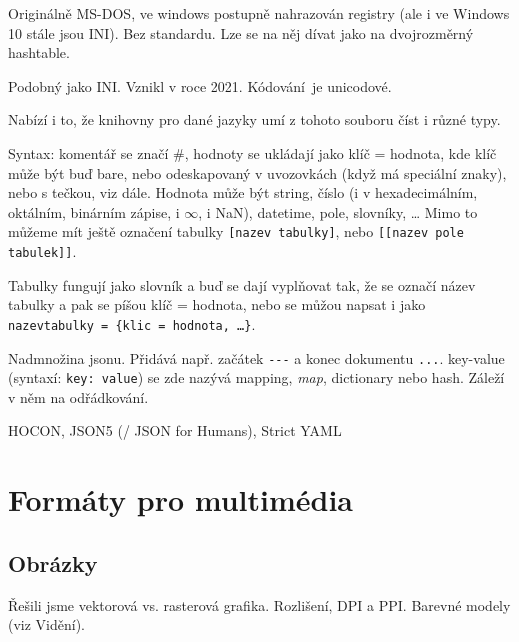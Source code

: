 \documentclass[12pt]{article}					%
\begin{document}
\begin{definice}
	Originálně MS-DOS, ve windows postupně nahrazován registry (ale i ve Windows 10 stále jsou INI). Bez standardu. Lze se na něj dívat jako na dvojrozměrný hashtable.
\end{definice}

\begin{definice}[TOML]
	Podobný jako INI. Vznikl v roce 2021. Kódování je unicodové. 

	Nabízí i to, že knihovny pro dané jazyky umí z tohoto souboru číst i různé typy.

	Syntax: komentář se značí \#, hodnoty se ukládají jako klíč = hodnota, kde klíč může být buď bare, nebo odeskapovaný v uvozovkách (když má speciální znaky), nebo s tečkou, viz dále. Hodnota může být string, číslo (i v hexadecimálním, oktálním, binárním zápise, i $∞$, i NaN), datetime, pole, slovníky, … Mimo to můžeme mít ještě označení tabulky \verb|[nazev tabulky]|, nebo \verb|[[nazev pole tabulek]]|.

	Tabulky fungují jako slovník a buď se dají vyplňovat tak, že se označí název tabulky a pak se píšou klíč = hodnota, nebo se můžou napsat i jako \verb|nazevtabulky = {klic = hodnota, …}|.
\end{definice}

\begin{definice}[YAML]
	Nadmnožina jsonu. Přidává např. začátek \verb|---| a konec dokumentu \verb|...|. key-value (syntaxí: \verb|key: value|) se zde nazývá mapping, \emph{map}, dictionary nebo hash. Záleží v něm na odřádkování.
\end{definice}

\begin{poznamka}
	HOCON, JSON5 (/ JSON for Humans), Strict YAML
\end{poznamka}


\section{Formáty pro multimédia}
\subsection{Obrázky}
\begin{poznamka}
	Řešili jsme vektorová vs. rasterová grafika. Rozlišení, DPI a PPI. Barevné modely (viz Vidění).
\end{poznamka}
\end{document}
